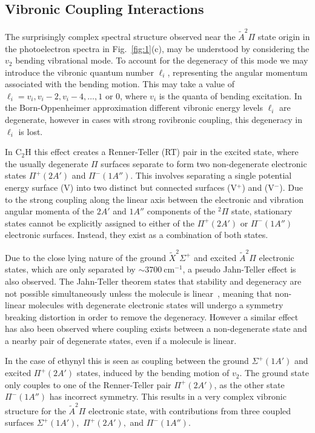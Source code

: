 \documentclass[journal=jpcafh,manuscript=article,layout=onecolumn, 12pt]{achemso}
\begin{document}


\subsection{Vibronic Coupling Interactions}
The surprisingly complex spectral structure observed near the $\tilde{A}^2\Pi$ state origin in the photoelectron spectra in Fig.~\ref{fig:1}(c), may be understood by considering the $v_2$ bending vibrational mode. To account for the degeneracy of this mode we may introduce the vibronic quantum number $\ell_i$, representing the angular momentum associated with the bending motion. This may take a value of $\ell_i = v_i, v_i-2, v_i-4,\dots,1$ or $0$, where $v_i$ is the quanta of bending excitation. In the Born-Oppenheimer approximation different vibronic energy levels $\ell_i$ are degenerate, however in cases with strong rovibronic coupling, this degeneracy in $\ell_i$ is lost. 

In C$_2$H this effect creates a Renner-Teller (RT) pair in the excited state, where the usually degenerate $\Pi$ surfaces separate to form two non-degenerate electronic states $\Pi^+ (2A')$ and $\Pi^-(1A'')$. This involves separating a single potential energy surface (V) into two distinct but connected surfaces (V$^+$) and (V$^-$). Due to the strong coupling along the linear axis between the electronic and vibration angular momenta of the $2A'$ and $1A''$ components of the $^2\Pi$ state, stationary states cannot be explicitly assigned to either of the $\Pi^+(2A')$ or $\Pi^-(1A'')$ electronic surfaces. Instead, they exist as a combination of both states.

Due to the close lying nature of the ground {$\tilde{X} ^2\Sigma^+$} and excited {$\tilde{A} ^2\Pi$} electronic states, which are only separated by $\sim3700~$cm$^{-1}$, a pseudo Jahn-Teller effect is also observed. The Jahn-Teller theorem states that stability and degeneracy are not possible simultaneously unless the molecule is linear~\cite{jah37}, meaning that non-linear molecules with degenerate electronic states will undergo a symmetry breaking distortion in order to remove the degeneracy. However a similar effect has also been observed where coupling exists between a non-degenerate state and a nearby pair of degenerate states, even if a molecule is linear.

In the case of ethynyl this is seen as coupling between the ground $\Sigma^+(1A')$ and excited $\Pi^+(2A')$ states, induced by the bending motion of $v_2$. The ground state only couples to one of the Renner-Teller pair $\Pi^+(2A')$, as the other state $\Pi^-(1A'')$ has incorrect symmetry. This results in a very complex vibronic structure for the $\tilde{A}^2\Pi$ electronic state, with contributions from three coupled surfaces $\Sigma^+(1A'),$ $\Pi^+(2A'),$ and $\Pi^-(1A'')$.
\end{document}
